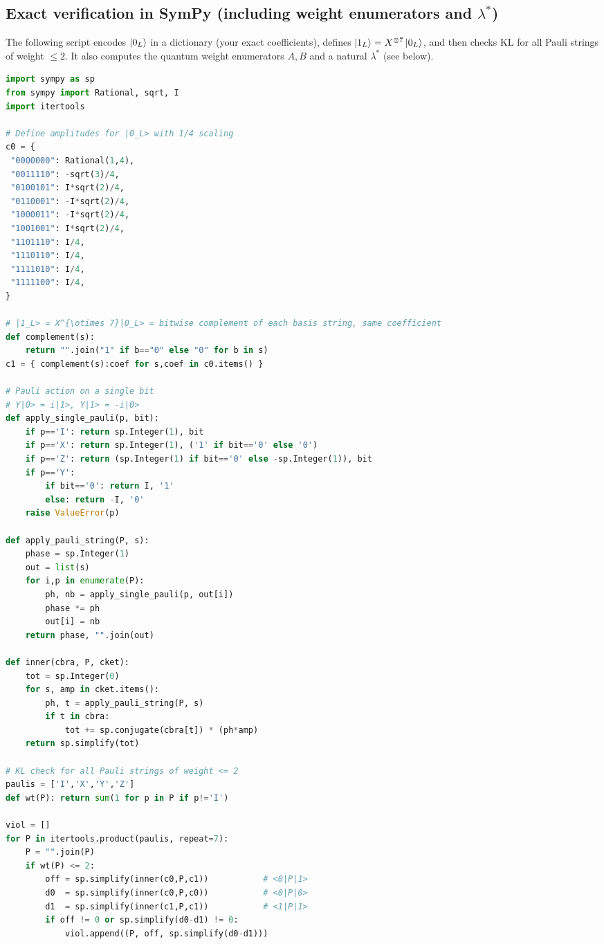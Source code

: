 \documentclass[11pt]{article}
\begin{document}
\subsection{Exact verification in SymPy (including weight enumerators and \(\lambda^\ast\))}

The following script encodes \(\ket{0_L}\) in a dictionary (your exact coefficients), defines \(\ket{1_L}=X^{\otimes 7}\ket{0_L}\), and then checks KL for all Pauli strings of weight \(\le 2\). It also computes the quantum weight enumerators \(A,B\) and a natural \(\lambda^\ast\) (see below).

\begin{lstlisting}[language=Python]
import sympy as sp
from sympy import Rational, sqrt, I
import itertools

# Define amplitudes for |0_L> with 1/4 scaling
c0 = {
 "0000000": Rational(1,4),
 "0011110": -sqrt(3)/4,
 "0100101": I*sqrt(2)/4,
 "0110001": -I*sqrt(2)/4,
 "1000011": -I*sqrt(2)/4,
 "1001001": I*sqrt(2)/4,
 "1101110": I/4,
 "1110110": I/4,
 "1111010": I/4,
 "1111100": I/4,
}

# |1_L> = X^{\otimes 7}|0_L> = bitwise complement of each basis string, same coefficient
def complement(s):
    return "".join("1" if b=="0" else "0" for b in s)
c1 = { complement(s):coef for s,coef in c0.items() }

# Pauli action on a single bit
# Y|0> = i|1>, Y|1> = -i|0>
def apply_single_pauli(p, bit):
    if p=='I': return sp.Integer(1), bit
    if p=='X': return sp.Integer(1), ('1' if bit=='0' else '0')
    if p=='Z': return (sp.Integer(1) if bit=='0' else -sp.Integer(1)), bit
    if p=='Y':
        if bit=='0': return I, '1'
        else: return -I, '0'
    raise ValueError(p)

def apply_pauli_string(P, s):
    phase = sp.Integer(1)
    out = list(s)
    for i,p in enumerate(P):
        ph, nb = apply_single_pauli(p, out[i])
        phase *= ph
        out[i] = nb
    return phase, "".join(out)

def inner(cbra, P, cket):
    tot = sp.Integer(0)
    for s, amp in cket.items():
        ph, t = apply_pauli_string(P, s)
        if t in cbra:
            tot += sp.conjugate(cbra[t]) * (ph*amp)
    return sp.simplify(tot)

# KL check for all Pauli strings of weight <= 2
paulis = ['I','X','Y','Z']
def wt(P): return sum(1 for p in P if p!='I')

viol = []
for P in itertools.product(paulis, repeat=7):
    P = "".join(P)
    if wt(P) <= 2:
        off = sp.simplify(inner(c0,P,c1))           # <0|P|1>
        d0  = sp.simplify(inner(c0,P,c0))           # <0|P|0>
        d1  = sp.simplify(inner(c1,P,c1))           # <1|P|1>
        if off != 0 or sp.simplify(d0-d1) != 0:
            viol.append((P, off, sp.simplify(d0-d1)))


\end{lstlisting}
\end{document}
